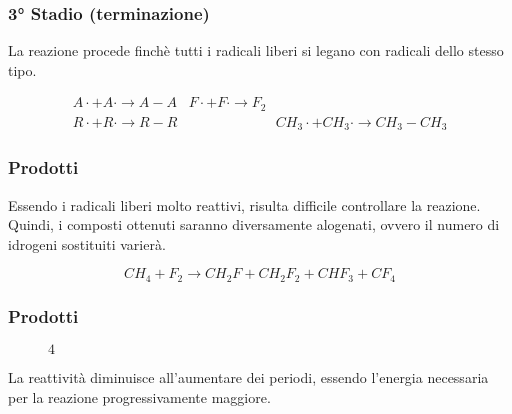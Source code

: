 \documentclass{beamer}
\begin{document}
	\begin{frame}[label=terminazione]
		\frametitle{3° Stadio (terminazione)}
		La reazione procede finchè tutti i radicali liberi si legano con radicali dello stesso tipo.
		
		\[
		\begin{matrix}
		A\cdot + A \cdot  \longrightarrow{} A-A & F\cdot + F\cdot  \longrightarrow{} F_2\\
		R\cdot + R\cdot  \longrightarrow{}  R-R &\qquad\qquad\quad \ \quad CH_3\cdot + CH_3\cdot  \longrightarrow{} CH_3-CH_3
		\end{matrix} \tag{3}
		\]
		
	
	\end{frame}
	\begin{frame}
	\frametitle{Prodotti}
	Essendo i radicali liberi molto reattivi, risulta difficile controllare la reazione.
	Quindi, i composti ottenuti saranno diversamente alogenati, ovvero il numero di idrogeni sostituiti varierà.
	
	\[
	CH_4+F_2 \longrightarrow{}
		CH_2F+
		CH_2F_2+
		CHF_3+
		CF_4
		\tag{4}
	\]
	\end{frame}
	\begin{frame}
	\frametitle{Prodotti}
	\begin{figure}
		\centering
	\caption{$4$}
	\end{figure}
	La reattività diminuisce all'aumentare dei periodi, essendo l'energia necessaria per la reazione progressivamente maggiore.
	\end{frame}
\end{document}
